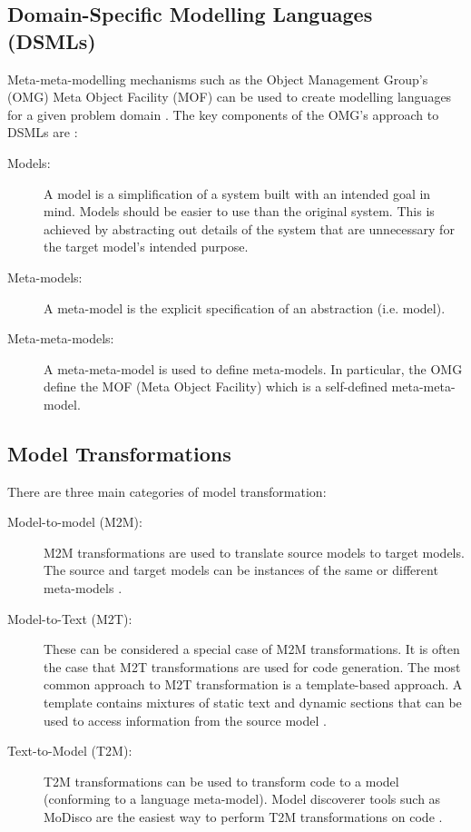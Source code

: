 \documentclass{UoYCSproject}
\begin{document}
\subsection{Domain-Specific Modelling Languages (DSMLs)}
Meta-meta-modelling mechanisms such as the Object Management Group's (OMG) Meta Object Facility (MOF) can be used to create modelling languages for a given problem domain \parencite{mussbacher2014relevance}. The key components of the OMG's approach to DSMLs are \parencite{bezivin2001towards}:
\begin{description}
\item[Models:] A model is a simplification of a system built with an intended goal in mind. Models should be easier to use than the original system. This is achieved by abstracting out details of the system that are unnecessary for the target model's intended purpose.
\item[Meta-models:] A meta-model is the explicit specification of an abstraction (i.e. model). 
\item[Meta-meta-models:]  A meta-meta-model is used to define meta-models. In particular, the OMG define the MOF (Meta Object Facility) which is a self-defined meta-meta-model.
\end{description}

\subsection{Model Transformations}
There are three main categories of model transformation:
\begin{description}
\item[Model-to-model (M2M):] M2M transformations are used to translate source models to target models. The source and target models can be instances of the same or different meta-models \parencite{czarnecki2003classification}.
\item[Model-to-Text (M2T):] These can be considered a special case of M2M transformations. It is often the case that M2T transformations are used for code generation. The most common approach to M2T transformation is a template-based approach. A template contains mixtures of static text and dynamic sections that can be used to access information from the source model \parencite{czarnecki2003classification}.
\item[Text-to-Model (T2M):]  T2M transformations can be used to transform code to a model (conforming to a language meta-model). Model discoverer tools such as MoDisco \parencite{bruneliere2014modisco} are the easiest way to perform T2M transformations on code \parencite{kowalczyk2009model}.
\end{description}
\end{document}
